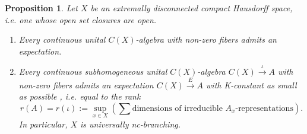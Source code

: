 \documentclass[11pt,leqno]{article}
\theoremstyle{plain}
\newtheorem{proposition}[lemma]{Proposition}
\theoremstyle{plain}
\theoremstyle{plain}
\numberwithin{equation}{section}
\theoremstyle{nonumberplain}
\newcommand\1{{\bf 1}}
\begin{document}
\begin{proposition}\label{pr:extr.disc}
  Let $X$ be an {\it extremally disconnected} compact Hausdorff space, i.e. \cite[\S I.4, p.32]{ss_countertop} one whose open set closures are open.

  \begin{enumerate}[(1),wide]
  \item\label{item:pr:extr.disc:gen} Every continuous unital $C(X)$-algebra with non-zero fibers admits an expectation. 
    
  \item\label{item:pr:extr.disc:subhom} Every continuous subhomogeneous unital $C(X)$-algebra $C(X)\xrightarrow{\iota}A$ with non-zero fibers admits an expectation $C(X)\xrightarrow{E}A$ with K-constant  as small as possible \cite[Theorem 1.4]{bg_cx-exp}, i.e. equal to the {\it rank} \cite[Remark 2.6]{bg_cx-exp}
    \begin{equation*}
      r(A)=r(\iota):=
      \sup_{x\in X}\left(\sum\text{dimensions of irreducible $A_x$-representations}\right). 
    \end{equation*}
    In particular, $X$ is universally nc-branching. 
  \end{enumerate}
\end{proposition}
\end{document}
